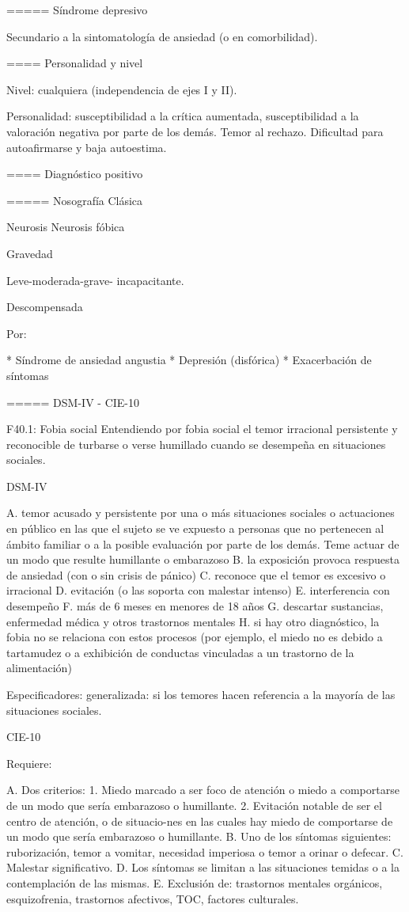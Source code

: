 \documentclass{scrbook}
\begin{document}
===== Síndrome depresivo

Secundario a la sintomatología de ansiedad (o en comorbilidad).

==== Personalidad y nivel

Nivel: cualquiera (independencia de ejes I y II).

Personalidad: susceptibilidad a la crítica aumentada, susceptibilidad a la valoración negativa por parte de los demás. Temor al rechazo. Dificultad para autoafirmarse y baja autoestima.

==== Diagnóstico positivo

===== Nosografía Clásica

Neurosis
Neurosis fóbica

Gravedad

Leve-moderada-grave- incapacitante.

Descompensada

Por:

* Síndrome de ansiedad angustia
* Depresión (disfórica)
* Exacerbación de síntomas

===== DSM-IV - CIE-10

F40.1: Fobia social Entendiendo por fobia social el temor irracional persistente y reconocible de turbarse o verse humillado cuando se desempeña en situaciones sociales.

DSM-IV

A. temor acusado y persistente por una o más situaciones sociales o actuaciones en público en las que el sujeto se ve expuesto a personas que no pertenecen al ámbito familiar o a la posible evaluación por parte de los demás. Teme actuar de un modo que resulte humillante o embarazoso
B. la exposición provoca respuesta de ansiedad (con o sin crisis de pánico)
C. reconoce que el temor es excesivo o irracional
D. evitación (o las soporta con malestar intenso)
E. interferencia con desempeño
F. más de 6 meses en menores de 18 años
G. descartar sustancias, enfermedad médica y otros trastornos mentales
H. si hay otro diagnóstico, la fobia no se relaciona con estos procesos (por ejemplo, el miedo no es debido a tartamudez o a exhibición de conductas vinculadas a un trastorno de la alimentación)

Especificadores: generalizada: si los temores hacen referencia a la mayoría de las situaciones sociales.

CIE-10

Requiere:

A. Dos criterios:
1. Miedo marcado a ser foco de atención o miedo a comportarse de un modo que sería embarazoso o humillante.
2. Evitación notable de ser el centro de atención, o de situacio-nes en las cuales hay miedo de comportarse de un modo que sería embarazoso o humillante.
B. Uno de los síntomas siguientes: ruborización, temor a vomitar, necesidad imperiosa o temor a orinar o defecar.
C. Malestar significativo.
D. Los síntomas se limitan a las situaciones temidas o a la contemplación de las mismas.
E. Exclusión de: trastornos mentales orgánicos, esquizofrenia, trastornos afectivos, TOC, factores culturales.
\end{document}
